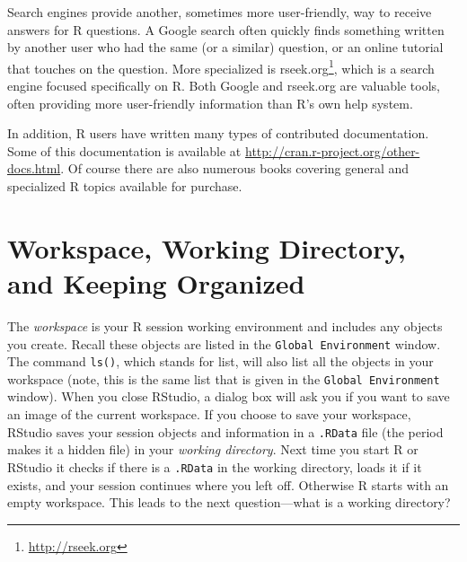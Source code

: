 \documentclass[
]{krantz}
\renewcommand{\href}[2]{#2\footnote{\url{#1}}}
\begin{document}
Search engines provide another, sometimes more user-friendly, way to receive answers for R questions. A Google search often quickly finds something written by another user who had the same (or a similar) question, or an online tutorial that touches on the question. More specialized is \href{http://rseek.org}{rseek.org}, which is a search engine focused specifically on R. Both Google and rseek.org are valuable tools, often providing more user-friendly information than R's own help system.

In addition, R users have written many types of contributed documentation. Some of this documentation is available at \url{http://cran.r-project.org/other-docs.html}. Of course there are also numerous books covering general and specialized R topics available for purchase.

\hypertarget{workspace-working-directory-and-keeping-organized}{%
\section{Workspace, Working Directory, and Keeping Organized}\label{workspace-working-directory-and-keeping-organized}}

The \emph{workspace} is your R session working environment and includes any objects you create. Recall these objects are listed in the \texttt{Global\ Environment} window. The command \texttt{ls()}, which stands for list, will also list all the objects in your workspace (note, this is the same list that is given in the \texttt{Global\ Environment} window). When you close RStudio, a dialog box will ask you if you want to save an image of the current workspace. If you choose to save your workspace, RStudio saves your session objects and information in a \texttt{.RData} file (the period makes it a hidden file) in your \emph{working directory}. Next time you start R or RStudio it checks if there is a \texttt{.RData} in the working directory, loads it if it exists, and your session continues where you left off. Otherwise R starts with an empty workspace. This leads to the next question---what is a working directory?
\end{document}
